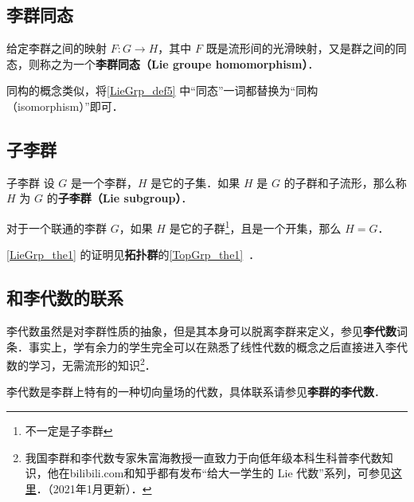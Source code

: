 \subsection{李群同态}

\begin{definition}{}\label{LieGrp_def5}
给定李群之间的映射 $F:G\to H$，其中 $F$ 既是流形间的光滑映射，又是群之间的同态，则称之为一个\textbf{李群同态（Lie groupe homomorphism）}．
\end{definition}

同构的概念类似，将\autoref{LieGrp_def5} 中“同态”一词都替换为“同构（isomorphism）”即可．

\subsection{子李群}

\begin{definition}{子李群}
设 $G$ 是一个李群，$H$ 是它的子集．如果 $H$ 是 $G$ 的子群和子流形，那么称 $H$ 为 $G$ 的\textbf{子李群（Lie subgroup）}．
\end{definition}

\begin{theorem}{}\label{LieGrp_the1}
对于一个联通的李群 $G$，如果 $H$ 是它的子群\footnote{不一定是子李群}，且是一个开集，那么 $H=G$．
\end{theorem}

\autoref{LieGrp_the1} 的证明见\textbf{拓扑群}的\autoref{TopGrp_the1}~．

\subsection{和李代数的联系}

李代数虽然是对李群性质的抽象，但是其本身可以脱离李群来定义，参见\textbf{李代数}词条．事实上，学有余力的学生完全可以在熟悉了线性代数的概念之后直接进入李代数的学习，无需流形的知识\footnote{我国李群和李代数专家朱富海教授一直致力于向低年级本科生科普李代数知识，他在bilibili.com和知乎都有发布“给大一学生的 Lie 代数”系列，可参见\href{https://space.bilibili.com/509086270?from=search&seid=2394735306274350134和https://zhuanlan.zhihu.com/p/161735986}{这里}．（2021年1月更新）．}．

李代数是李群上特有的一种切向量场的代数，具体联系请参见\textbf{李群的李代数}．




